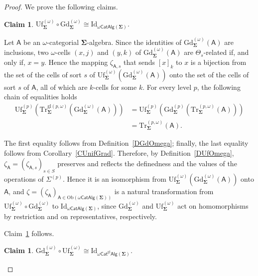 \documentclass[a4paper, reqno
]{amsart}
\newcommand{\sig}[1]{\mathbf{#1}}             %
\newcommand{\calg}[1]{\boldsymbol{\mathsf{#1}}} %
\newcommand{\Id}{\mathrm{Id}}
\newcommand{\gl}{\mathrm{gl}}                %
\newcommand{\Gd}{\mathrm{Gd}}
\newcommand{\Uf}{\mathrm{Uf}}
\newcommand{\Tr}{\mathrm{Tr}}
\theoremstyle{plain}
\newtheorem{claim}[theorem]{Claim}
\theoremstyle{definition}
\begin{document}
\begin{proof}
We prove the following claims.

\begin{claim}\label{COmegaGdUfA}
$\Uf^{(\omega)}_{\sig{\Sigma}}\circ\Gd^{(\omega)}_{\sig{\Sigma}}\cong\Id_{\omega\mathsf{CatAlg}(\sig{\Sigma})}$.
\end{claim}

Let $\calg{A}$ be an $\omega$-categorial $\sig{\Sigma}$-algebra.
Since the identities of $\Gd^{(\omega)}_{\sig{\Sigma}}(\calg{A})$ are inclusions, two $\omega$-cells $(x,j)$ and $(y,k)$ of $\Gd^{(\omega)}_{\sig{\Sigma}}(\calg{A})$ are $\Theta_{s}$-related if, and only if, $x=y$.
Hence the mapping $\zeta_{\calg{A},s}$ that sends $[x]_{k}$ to $x$ is a bijection from the set of the cells of sort $s$ of $\Uf^{(\omega)}_{\sig{\Sigma}}(\Gd^{(\omega)}_{\sig{\Sigma}}(\calg{A}))$ onto the set of the cells of sort $s$ of $\calg{A}$, all of which are $k$-cells for some $k$.
For every level $p$, the following chain of equalities holds
\begin{align*}
\Uf^{(p)}_{\sig{\Sigma}}\left(\Tr^{\gl(p,\omega)}_{\sig{\Sigma}}\left(\Gd^{(\omega)}_{\sig{\Sigma}}(\calg{A})\right)\right)
&=
\Uf^{(p)}_{\sig{\Sigma}}\left(\Gd^{(p)}_{\sig{\Sigma}}\left(\Tr^{(p,\omega)}_{\sig{\Sigma}}(\calg{A})\right)\right)
\tag{1}
\\&=
\Tr^{(p,\omega)}_{\sig{\Sigma}}(\calg{A}).
\tag{2}
\end{align*}

The first equality follows from Definition~\ref{DGdOmega}; finally, the last equality follows from Corollary~\ref{CUnifGrad}.
Therefore, by Definition~\ref{DUfOmega}, $\zeta_{\calg{A}}=(\zeta_{\calg{A},s})_{s\in S}$ preserves and reflects the definedness and the values of the operations of $\Sigma^{(p)}$.
Hence it is an isomorphism from $\Uf^{(\omega)}_{\sig{\Sigma}}(\Gd^{(\omega)}_{\sig{\Sigma}}(\calg{A}))$ onto $\calg{A}$, and $\zeta=(\zeta_{\calg{A}})_{\calg{A}\in\mathrm{Ob}(\omega\mathsf{CatAlg}(\sig{\Sigma}))}$ is a natural transformation from $\Uf^{(\omega)}_{\sig{\Sigma}}\circ\Gd^{(\omega)}_{\sig{\Sigma}}$ to $\Id_{\omega\mathsf{CatAlg}(\sig{\Sigma})}$, since $\Gd^{(\omega)}_{\sig{\Sigma}}$ and $\Uf^{(\omega)}_{\sig{\Sigma}}$ act on homomorphisms by restriction and on representatives, respectively.

Claim~\ref{COmegaGdUfA} follows.

\begin{claim}\label{COmegaGdUfB}
$\Gd^{(\omega)}_{\sig{\Sigma}}\circ\Uf^{(\omega)}_{\sig{\Sigma}}\cong\Id_{\omega\mathsf{Cat}^{\gl}\mathsf{Alg}(\sig{\Sigma})}$.
\end{claim}


\end{proof}
\end{document}
